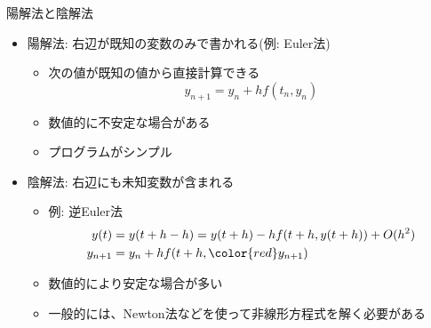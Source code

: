 \begin{frame}[t,fragile]{陽解法と陰解法}
  \begin{itemize}
  \item 陽解法: 右辺が既知の変数のみで書かれる(例: Euler法)
    \begin{itemize}
    \item 次の値が既知の値から直接計算できる
      \[
         y_{n+1} = y_n + h f(t_n, y_n)
      \]
    \item 数値的に不安定な場合がある
    \item プログラムがシンプル
    \end{itemize}
  \item 陰解法: 右辺にも未知変数が含まれる
    \begin{itemize}
    \item 例: 逆Euler法
      \begin{align*}
        y(t) &= y(t+h-h) = y(t+h) - h f(t+h,y(t+h)) + O(h^2) \\
        y_{n+1} &= y_n + h f(t+h,{\color{red}y_{n+1}})
      \end{align*}
    \item 数値的により安定な場合が多い
    \item 一般的には、Newton法などを使って非線形方程式を解く必要がある
    \end{itemize}
  \end{itemize}
\end{frame}
